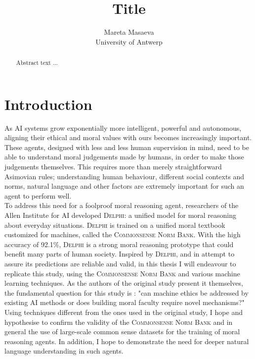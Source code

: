 \documentclass[final]{clv3} %
\title{Title}
\author{Mareta Masaeva \\ University of Antwerp}
\begin{document}




\maketitle %


\begin{abstract}

Abstract text ...

\end{abstract}

\section{Introduction} \label{sec:intro}

As AI systems grow exponentially more intelligent, powerful and autonomous, aligning their ethical and moral values with ours becomes increasingly important. These agents, designed with less and less human supervision in mind, need to be able to understand moral judgements made by humans, in order to make those judgements themselves. This requires more than merely straightforward Asimovian rules; understanding human behaviour, different social contexts and norms, natural language and other factors are extremely important for such an agent to perform well.\\

To address this need for a foolproof moral reasoning agent, researchers of the Allen Institute for AI developed \textsc{Delphi}: a unified model for moral reasoning about everyday situations. \textsc{Delphi} is trained on a unified moral textbook customized for machines, called the \textsc{Commonsense Norm Bank}. With the high accuracy of 92.1\%, \textsc{Delphi} is a strong moral reasoning prototype that could benefit many parts of human society. Inspired by \textsc{Delphi}, and in attempt to assure its predictions are reliable and valid, in this thesis I will endeavour to replicate this study, using the \textsc{Commonsense Norm Bank} and various machine learning techniques. As the authors of the original study present it themselves, the fundamental question for this study is : "can machine ethics be addressed by existing AI methods or does building moral faculty require novel mechanisms?" Using techniques different from the ones used in the original study, I hope and hypothesise to confirm the validity of the \textsc{Commonsense Norm Bank} and in general the use of large-scale common sense datasets for the training of moral reasoning agents. In addition, I hope to demonstrate the need for deeper natural language understanding in such agents.\\
\end{document}
